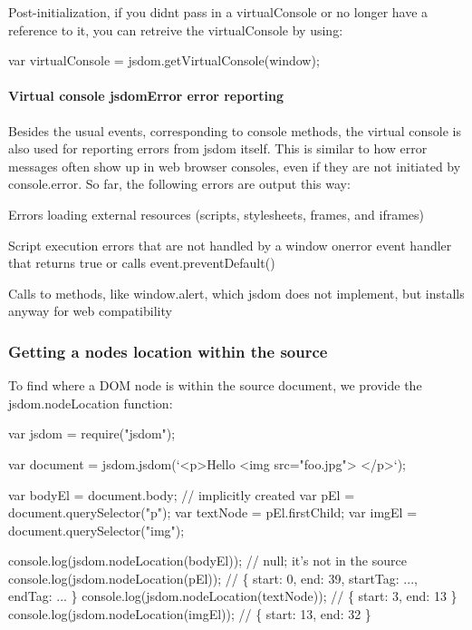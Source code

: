 Post-\/initialization, if you didn\textquotesingle{}t pass in a {\ttfamily virtual\+Console} or no longer have a reference to it, you can retreive the {\ttfamily virtual\+Console} by using\+:


\begin{DoxyCode}
var virtualConsole = jsdom.getVirtualConsole(window);
\end{DoxyCode}


\paragraph*{Virtual console {\ttfamily jsdom\+Error} error reporting}

Besides the usual events, corresponding to {\ttfamily console} methods, the virtual console is also used for reporting errors from jsdom itself. This is similar to how error messages often show up in web browser consoles, even if they are not initiated by {\ttfamily console.\+error}. So far, the following errors are output this way\+:


\begin{DoxyItemize}
\item Errors loading external resources (scripts, stylesheets, frames, and iframes)
\item Script execution errors that are not handled by a window {\ttfamily onerror} event handler that returns {\ttfamily true} or calls {\ttfamily event.\+prevent\+Default()}
\item Calls to methods, like {\ttfamily window.\+alert}, which jsdom does not implement, but installs anyway for web compatibility
\end{DoxyItemize}

\subsubsection*{Getting a node\textquotesingle{}s location within the source}

To find where a D\+OM node is within the source document, we provide the {\ttfamily jsdom.\+node\+Location} function\+:


\begin{DoxyCode}
var jsdom = require("jsdom");

var document = jsdom.jsdom(`<p>Hello
    <img src="foo.jpg">
  </p>`);

var bodyEl = document.body; // implicitly created
var pEl = document.querySelector("p");
var textNode = pEl.firstChild;
var imgEl = document.querySelector("img");

console.log(jsdom.nodeLocation(bodyEl));   // null; it's not in the source
console.log(jsdom.nodeLocation(pEl));      // \{ start: 0, end: 39, startTag: ..., endTag: ... \}
console.log(jsdom.nodeLocation(textNode)); // \{ start: 3, end: 13 \}
console.log(jsdom.nodeLocation(imgEl));    // \{ start: 13, end: 32 \}
\end{DoxyCode}


